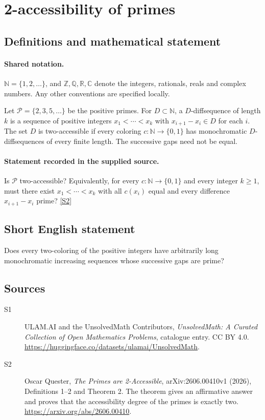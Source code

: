 \documentclass[11pt]{article}
\newcommand{\sref}[2]{\hyperlink{source:#1:#2}{[S#2]}}
\begin{document}
\section{2-accessibility of primes}\label{statement}

\subsection{Definitions and mathematical statement}

\paragraph{Shared notation.}$\mathbb N=\{1,2,\ldots\}$, and $\mathbb Z,\mathbb Q,\mathbb R,\mathbb C$ denote the integers, rationals, reals and complex numbers. Any other conventions are specified locally.


Let $\mathcal P=\{2,3,5,\ldots\}$ be the positive primes. For $D\subset\mathbb N$, a $D$-diffsequence of length $k$ is a sequence of positive integers $x_1<\cdots<x_k$ with $x_{i+1}-x_i\in D$ for each $i$. The set $D$ is two-accessible if every coloring $c:\mathbb N\to\{0,1\}$ has monochromatic $D$-diffsequences of every finite length. The successive gaps need not be equal.
\paragraph{Statement recorded in the supplied source.}
Is $\mathcal P$ two-accessible? Equivalently, for every $c:\mathbb N\to\{0,1\}$ and every integer $k\geq1$, must there exist $x_1<\cdots<x_k$ with all $c(x_i)$ equal and every difference $x_{i+1}-x_i$ prime? \sref{statement}{2}
\subsection{Short English statement}
Does every two-coloring of the positive integers have arbitrarily long monochromatic increasing sequences whose successive gaps are prime?
\subsection{Sources}
\begin{description}
\item[\hypertarget{source:statement:1}{S1}] ULAM.AI and the UnsolvedMath Contributors, \emph{UnsolvedMath: A Curated Collection of Open Mathematics Problems}, catalogue entry. CC BY 4.0. \url{https://huggingface.co/datasets/ulamai/UnsolvedMath}.
\item[\hypertarget{source:statement:2}{S2}] Oscar Quester, \emph{The Primes are 2-Accessible}, arXiv:2606.00410v1 (2026), Definitions 1--2 and Theorem 2. The theorem gives an affirmative answer and proves that the accessibility degree of the primes is exactly two. \url{https://arxiv.org/abs/2606.00410}.
\end{description}
\label{end:statement}
\end{document}
